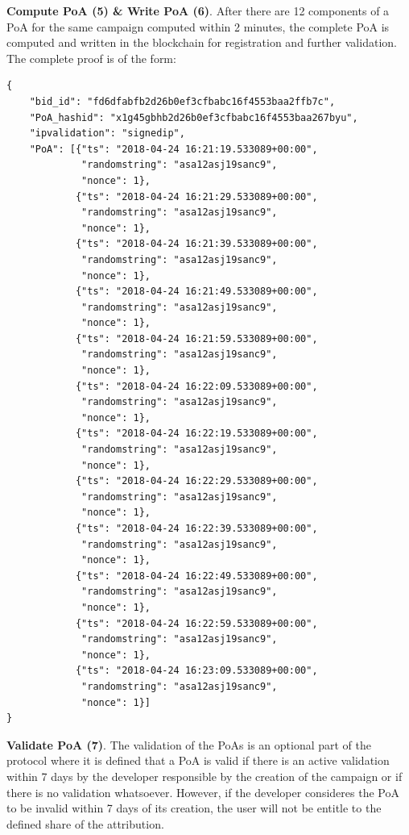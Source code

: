 \noindent \textbf{Compute \textsf{PoA} (5) \& Write \textsf{PoA} (6)}. After there are 12 components of a \textsf{PoA} for the same campaign computed within 2 minutes, the complete \textsf{PoA} is computed and written in the blockchain for registration and further validation. The complete proof is of the form:
\begin{tcolorbox}[enhanced jigsaw,sharp corners, drop fuzzy shadow=ShadowColor]
\begin{lstlisting}[xleftmargin=0.05\textwidth]
{
    "bid_id": "fd6dfabfb2d26b0ef3cfbabc16f4553baa2ffb7c",
    "PoA_hashid": "x1g45gbhb2d26b0ef3cfbabc16f4553baa267byu",
    "ipvalidation": "signedip",
    "PoA": [{"ts": "2018-04-24 16:21:19.533089+00:00",
             "randomstring": "asa12asj19sanc9",
             "nonce": 1},
            {"ts": "2018-04-24 16:21:29.533089+00:00",
             "randomstring": "asa12asj19sanc9",
             "nonce": 1},
            {"ts": "2018-04-24 16:21:39.533089+00:00",
             "randomstring": "asa12asj19sanc9",
             "nonce": 1},
            {"ts": "2018-04-24 16:21:49.533089+00:00",
             "randomstring": "asa12asj19sanc9",
             "nonce": 1},
            {"ts": "2018-04-24 16:21:59.533089+00:00",
             "randomstring": "asa12asj19sanc9",
             "nonce": 1},
            {"ts": "2018-04-24 16:22:09.533089+00:00",
             "randomstring": "asa12asj19sanc9",
             "nonce": 1},
            {"ts": "2018-04-24 16:22:19.533089+00:00",
             "randomstring": "asa12asj19sanc9",
             "nonce": 1},
            {"ts": "2018-04-24 16:22:29.533089+00:00",
             "randomstring": "asa12asj19sanc9",
             "nonce": 1},
            {"ts": "2018-04-24 16:22:39.533089+00:00",
             "randomstring": "asa12asj19sanc9",
             "nonce": 1},
            {"ts": "2018-04-24 16:22:49.533089+00:00",
             "randomstring": "asa12asj19sanc9",
             "nonce": 1},
            {"ts": "2018-04-24 16:22:59.533089+00:00",
             "randomstring": "asa12asj19sanc9",
             "nonce": 1},
            {"ts": "2018-04-24 16:23:09.533089+00:00",
             "randomstring": "asa12asj19sanc9",
             "nonce": 1}]
}
\end{lstlisting}
\end{tcolorbox}
\pagebreak

\noindent \textbf{Validate \textsf{PoA} (7)}. The validation of the \textsf{PoAs} is an optional part of the protocol where it is defined that a \textsf{PoA} is valid if there is an active validation within 7 days by the developer responsible by the creation of the campaign or if there is no validation whatsoever. However, if the developer consideres the \textsf{PoA} to be invalid within 7 days of its creation, the user will not be entitle to the defined share of the attribution.

